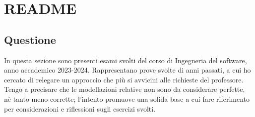 \documentclass{article}
\begin{document}
\pagestyle{empty}
\section*{README}
\large

\subsection*{Questione}
In questa sezione sono presenti esami svolti del corso di Ingegneria del software, anno accademico 2023-2024. Rappresentano prove svolte di anni passati, a cui ho cercato di relegare un approccio che più si avvicini alle richieste del professore. Tengo a precisare che le modellazioni relative non sono da considerare perfette, nè tanto meno corrette; l'intento promuove una solida base a cui fare riferimento per considerazioni e riflessioni sugli esercizi svolti. 
\end{document}
